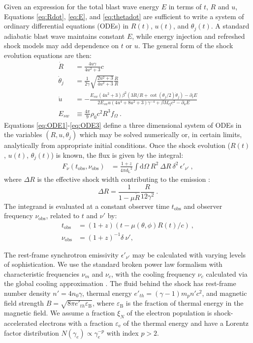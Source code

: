 \documentclass[twocolumn]{aastex62}
\newcommand{\dd}{\ensuremath{\mathrm{d}}}
\newcommand{\Mej}{\ensuremath{M_{\mathrm{ej}}}}
\newcommand{\tobs}{\ensuremath{t_{\mathrm{obs}}}}
\newcommand{\nuobs}{\ensuremath{\nu_{\mathrm{obs}}}}
\newcommand{\epse}{\ensuremath{\varepsilon_{\mathrm{e}}}}
\newcommand{\epsB}{\ensuremath{\varepsilon_{\mathrm{B}}}}
\newcommand{\xiN}{\ensuremath{\xi_N}}
\newcommand{\dL}{\ensuremath{d_{\mathrm{L}}}}
\begin{document}
Given an expression for the total blast wave energy $E$ in terms of $t$, $R$ and $u$, Equations \eqref{eq:Rdot}, \eqref{eq:E}, and \eqref{eq:thetadot} are sufficient to write a system of ordinary differential equations (ODEs) in $R(t)$, $u(t)$, and $\theta_j(t)$. A standard adiabatic blast wave maintains constant $E$, while energy injection and refreshed shock models may add dependence on $t$ or $u$. The general form of the shock evolution equations are then:
\begin{align}
	\dot{R} &= \frac{4 u \gamma}{4 u^2 +3}c  \label{eq:ODE1}\\
	\dot{\theta}_j &= \frac{1}{2\gamma}\sqrt{\frac{2u^2+3}{4u^2+3}} \frac{\dot{R}}{R}  \label{eq:ODE2} \\
	\dot{u} &= -\frac{E_{sw}(4u^2+3)\beta^2 (3\dot{R}/R + \cot (\theta_j/2) \dot{\theta}_j) - \partial_t E}{2 E_{sw} u (4u^4 + 8u^2 + 3)\gamma^{-4} + \beta \Mej c^2 - \partial_u E}  \label{eq:ODE3} \\
	E_{sw} &\equiv \frac{4\pi}{9} \rho_0 c^2 R^3 f_\Omega\ . \nonumber
\end{align}
Equations \eqref{eq:ODE1}-\eqref{eq:ODE3} define a three dimensional system of ODEs in the variables $(R, u, \theta_j)$ which may be solved numerically or, in certain limits, analytically from appropriate initial conditions.  Once the shock evolution ($R(t)$, $u(t)$, $\theta_j(t)$) is known, the flux is given by the integral:
\begin{align}
	F_\nu(\tobs, \nuobs) &= \frac{1+z}{4\pi \dL^2} \int \! \dd \Omega\ R^2\ \Delta R\  \delta^2\ \epsilon'_{\nu'} \ , \label{eq:flux2}
\end{align}
where $\Delta R$ is the effective shock width contributing to the emission \citep{van-Eerten:2010aa}:
\begin{equation}
	\Delta R = \frac{1}{1-\mu \dot{R}} \frac{R}{12\gamma^2} \ . \label{eq:dr}
\end{equation}
 The integrand is evaluated at a constant observer time $\tobs$ and observer frequency $\nuobs$, related to $t$ and $\nu'$ by:
\begin{align}
	\tobs &= (1+z) \left(t - \mu(\theta, \phi) R(t)/c\right)\ , \label{eq:tobs} \\
	\nuobs &= (1+z)^{-1} \delta\ \nu' , \label{eq:nuobs}
\end{align}

The rest-frame synchrotron emissivity $\epsilon'_{\nu'}$ may be calculated with varying levels of sophistication.  We use the standard broken power law formalism with characteristic frequencies $\nu_m$ and $\nu_c$, with the cooling frequency $\nu_c$ calculated via the global cooling approximation \citep{Granot:2002aa, van-Eerten:2010aa}.  The fluid behind the shock has rest-frame number density $n' = 4n_0\gamma$, thermal energy $e'_{th} = (\gamma-1)m_p n' c^2$, and magnetic field strength $B = \sqrt{8\pi e'_{th} \epsB}$, where $\epsB$ is the fraction of thermal energy in the magnetic field. We assume a fraction $\xiN$ of the electron population is shock-accelerated electrons with a fraction $\epse$ of the thermal energy and have a Lorentz factor distribution $N(\gamma_e) \propto \gamma_e^{-p}$ with index $p>2$.
\end{document}
